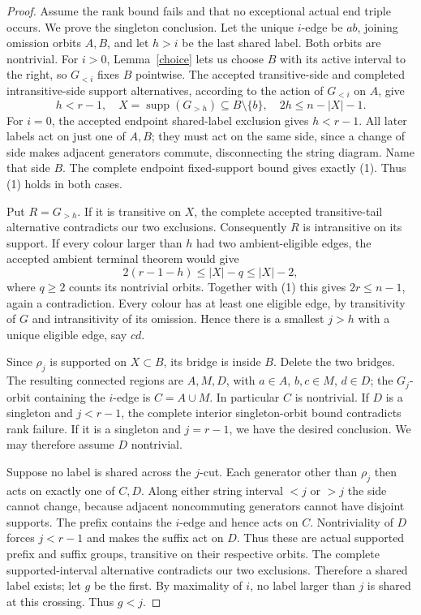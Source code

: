 \documentclass[11pt,a4paper]{article}
\begin{document}
\begin{proof}
Assume the rank bound fails and that no exceptional actual end
triple occurs. We prove the singleton conclusion.
Let the unique $i$-edge be $ab$, joining omission orbits $A,B$,
and let $h>i$ be the last shared label. Both orbits are nontrivial.
For $i>0$, Lemma~\ref{choice} lets us choose $B$ with its active
interval to the right, so $G_{<i}$ fixes $B$ pointwise.
The accepted transitive-side and completed intransitive-side
support alternatives, according to the action of $G_{<i}$ on $A$,
give
\[
 h<r-1,\quad X=\operatorname{supp}(G_{>h})\subseteq B\setminus\{b\},
 \quad 2h\leq n-|X|-1.                                \tag{1}
\]
For $i=0$, the accepted endpoint shared-label exclusion gives
$h<r-1$. All later labels act on just one of $A,B$; they must act
on the same side, since a change of side makes adjacent generators
commute, disconnecting the string diagram. Name that side $B$.
The complete endpoint fixed-support bound gives exactly (1).
Thus (1) holds in both cases.

Put $R=G_{>h}$. If it is transitive on $X$, the complete accepted
transitive-tail alternative contradicts our two exclusions.
Consequently $R$ is intransitive on its support. If every colour
larger than $h$ had two ambient-eligible edges, the accepted ambient
terminal theorem would give
\[
 2(r-1-h)\leq |X|-q\leq|X|-2,
\]
where $q\geq2$ counts its nontrivial orbits. Together with (1)
this gives $2r\leq n-1$, again a contradiction. Every colour has
at least one eligible edge, by transitivity of $G$ and intransitivity
of its omission. Hence there is a smallest $j>h$ with a unique
eligible edge, say $cd$.

Since $\rho_j$ is supported on $X\subset B$, its bridge is inside
$B$. Delete the two bridges. The resulting connected regions are
$A,M,D$, with $a\in A$, $b,c\in M$, $d\in D$; the $G_j$-orbit
containing the $i$-edge is $C=A\cup M$. In particular $C$ is
nontrivial. If $D$ is a singleton and $j<r-1$, the complete interior
singleton-orbit bound contradicts rank failure. If it is a singleton
and $j=r-1$, we have the desired conclusion. We may therefore assume
$D$ nontrivial.

Suppose no label is shared across the $j$-cut. Each generator other
than $\rho_j$ then acts on exactly one of $C,D$. Along either string
interval $<j$ or $>j$ the side cannot change, because adjacent
noncommuting generators cannot have disjoint supports. The prefix
contains the $i$-edge and hence acts on $C$. Nontriviality of $D$
forces $j<r-1$ and makes the suffix act on $D$. Thus these are actual
supported prefix and suffix groups, transitive on their respective
orbits. The complete supported-interval alternative contradicts our
two exclusions. Therefore a shared label exists; let $g$ be the first.
By maximality of $i$, no label larger than $j$ is shared at this
crossing. Thus $g<j$.


\end{proof}
\end{document}
